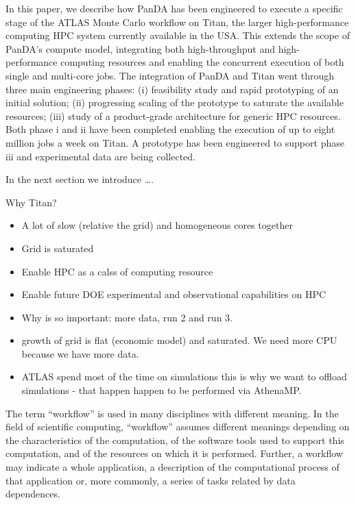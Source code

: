 In this paper, we describe how PanDA has been engineered to execute a specific
stage of the ATLAS Monte Carlo workflow on Titan, the larger high-performance
computing HPC system currently available in the USA\@. This extends
the scope of PanDA's compute model, integrating both high-throughput and
high-performance computing resources and enabling the concurrent execution of
both  single and multi-core jobs. The integration of PanDA and Titan went
through three main engineering phases: (i) feasibility study and rapid
prototyping of an initial solution; (ii) progressing scaling of the  prototype
to saturate the available resources; (iii) study of a product-grade architecture
for generic HPC resources. Both phase i and ii have been completed enabling the
execution of up to eight million jobs a week on Titan. A prototype has been
engineered to support phase iii and experimental data are being collected.

In the next section we introduce \ldots.

Why Titan?
\begin{itemize}
    \item A lot of slow (relative the grid) and homogeneous cores together
    \item Grid is saturated
    \item Enable HPC as a calss of computing resource
    \item Enable future DOE experimental and observational capabilities on HPC
    \item Why is so important: more data, run 2 and run 3.
    \item growth of grid is flat (economic model) and saturated. We need more CPU because we have more data.
    \item ATLAS spend most of the time on simulations this is why we want to offload simulations - that happen happen to be performed via AthenaMP.
\end{itemize}


The term ``workflow'' is used in many disciplines with different meaning. In the
field of scientific computing, ``workflow'' assumes different meanings depending
on the characteristics of the computation, of the software tools used to support
this computation, and of the resources on which it is performed. Further, a
workflow may indicate a whole application, a description of the computational
process of that application or, more commonly, a series of tasks related by data
dependences.

